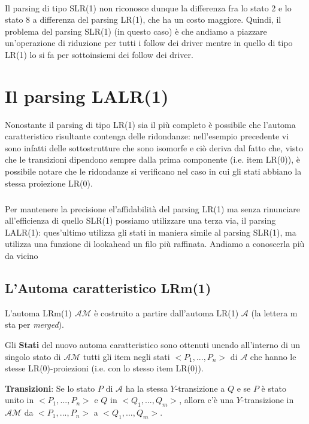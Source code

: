 \documentclass[class=book, crop=false, oneside, 12pt]{standalone}
\begin{document}
\paragraph*{}
Il parsing di tipo SLR(1) non riconosce dunque la differenza fra lo stato 2 e lo stato 8 a differenza del parsing LR(1), che ha un costo maggiore. Quindi, il problema del parsing SLR(1) (in questo caso) è che andiamo a piazzare un'operazione di riduzione per tutti i follow dei driver mentre in quello di tipo LR(1) lo si fa per sottoinsiemi dei follow dei driver.

\section{Il parsing LALR(1)}
Nonostante il parsing di tipo LR(1) sia il più completo è possibile che l'automa caratteristico risultante contenga delle ridondanze: nell'esempio precedente vi sono infatti delle sottostrutture che sono isomorfe e ciò deriva dal fatto che, visto che le transizioni dipendono sempre dalla prima componente (i.e. item LR(0)), è possibile notare che le ridondanze si verificano nel caso in cui gli stati abbiano la stessa proiezione LR(0).
\subparagraph*{}
Per mantenere la precisione el'affidabilità del parsing LR(1) ma senza rinunciare all'efficienza di quello SLR(1) possiamo utilizzare una terza via, il parsing LALR(1): ques'ultimo utilizza gli stati in maniera simile al parsing SLR(1), ma utilizza una funzione di lookahead un filo più raffinata. Andiamo a conoscerla più da vicino

\subsection{L'Automa caratteristico LRm(1)}

L'automa LRm(1) \(\mathcal{AM}\) è costruito a partire dall'automa LR(1) \(\mathcal{A}\) (la lettera m sta per \emph{merged}).

Gli \textbf{Stati} del nuovo automa caratteristico sono ottenuti unendo all'interno di un singolo stato di \(\mathcal{AM}\) tutti gli item negli stati \(<P_1, ..., P_n>\) di \(\mathcal{A}\) che hanno le stesse LR(0)-proiezioni (i.e. con lo stesso item LR(0)).

\textbf{Transizioni}: Se lo stato \(P\) di \(\mathcal{A}\) ha la stessa \(Y\)-transizione a \(Q\) e se \(P\) è stato unito in \(<P_1, ..., P_n>\) e \(Q\) in \(<Q_1, ..., Q_m>\), allora c'è una \(Y\)-transizione in \(\mathcal{AM}\) da \(<P_1, ..., P_n>\) a \(<Q_1, ..., Q_m>\).
\end{document}
